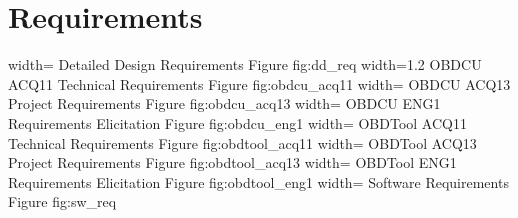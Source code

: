 \chapter{Requirements}
\label{sec:Appendix}
 {width=\textwidth}%
 {Detailed Design Requirements}%
 {Figure}%
 {fig:dd_req}%
 {width=1.2\textwidth}%
 {OBDCU ACQ11 Technical Requirements}%
 {Figure}%
 {fig:obdcu_acq11}%
 {width=\textwidth}%
 {OBDCU ACQ13 Project Requirements}%
 {Figure}%
 {fig:obdcu_acq13}%
 {width=\textwidth}%
 {OBDCU ENG1 Requirements Elicitation}%
 {Figure}%
 {fig:obdcu_eng1}%
 {width=\textwidth}%
 {OBDTool ACQ11 Technical Requirements}%
 {Figure}%
 {fig:obdtool_acq11}%
 {width=\textwidth}%
 {OBDTool ACQ13 Project Requirements}%
 {Figure}%
 {fig:obdtool_acq13}%
 {width=\textwidth}%
 {OBDTool ENG1 Requirements Elicitation}%
 {Figure}%
 {fig:obdtool_eng1}%
 {width=\textwidth}%
 {Software Requirements}%
 {Figure}%
 {fig:sw_req}%